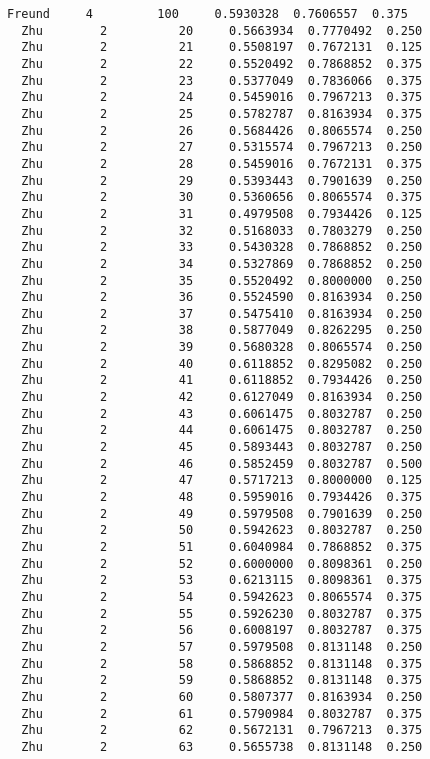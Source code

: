 \documentclass[11pt]{article}
\begin{document}
\begin{Verbatim}[commandchars=\\\{\}]
  Freund     4         100     0.5930328  0.7606557  0.375
  Zhu        2          20     0.5663934  0.7770492  0.250
  Zhu        2          21     0.5508197  0.7672131  0.125
  Zhu        2          22     0.5520492  0.7868852  0.375
  Zhu        2          23     0.5377049  0.7836066  0.375
  Zhu        2          24     0.5459016  0.7967213  0.375
  Zhu        2          25     0.5782787  0.8163934  0.375
  Zhu        2          26     0.5684426  0.8065574  0.250
  Zhu        2          27     0.5315574  0.7967213  0.250
  Zhu        2          28     0.5459016  0.7672131  0.375
  Zhu        2          29     0.5393443  0.7901639  0.250
  Zhu        2          30     0.5360656  0.8065574  0.375
  Zhu        2          31     0.4979508  0.7934426  0.125
  Zhu        2          32     0.5168033  0.7803279  0.250
  Zhu        2          33     0.5430328  0.7868852  0.250
  Zhu        2          34     0.5327869  0.7868852  0.250
  Zhu        2          35     0.5520492  0.8000000  0.250
  Zhu        2          36     0.5524590  0.8163934  0.250
  Zhu        2          37     0.5475410  0.8163934  0.250
  Zhu        2          38     0.5877049  0.8262295  0.250
  Zhu        2          39     0.5680328  0.8065574  0.250
  Zhu        2          40     0.6118852  0.8295082  0.250
  Zhu        2          41     0.6118852  0.7934426  0.250
  Zhu        2          42     0.6127049  0.8163934  0.250
  Zhu        2          43     0.6061475  0.8032787  0.250
  Zhu        2          44     0.6061475  0.8032787  0.250
  Zhu        2          45     0.5893443  0.8032787  0.250
  Zhu        2          46     0.5852459  0.8032787  0.500
  Zhu        2          47     0.5717213  0.8000000  0.125
  Zhu        2          48     0.5959016  0.7934426  0.375
  Zhu        2          49     0.5979508  0.7901639  0.250
  Zhu        2          50     0.5942623  0.8032787  0.250
  Zhu        2          51     0.6040984  0.7868852  0.375
  Zhu        2          52     0.6000000  0.8098361  0.250
  Zhu        2          53     0.6213115  0.8098361  0.375
  Zhu        2          54     0.5942623  0.8065574  0.375
  Zhu        2          55     0.5926230  0.8032787  0.375
  Zhu        2          56     0.6008197  0.8032787  0.375
  Zhu        2          57     0.5979508  0.8131148  0.250
  Zhu        2          58     0.5868852  0.8131148  0.375
  Zhu        2          59     0.5868852  0.8131148  0.375
  Zhu        2          60     0.5807377  0.8163934  0.250
  Zhu        2          61     0.5790984  0.8032787  0.375
  Zhu        2          62     0.5672131  0.7967213  0.375
  Zhu        2          63     0.5655738  0.8131148  0.250

\end{Verbatim}
\end{document}
